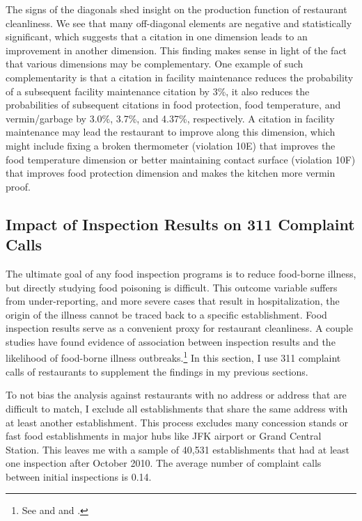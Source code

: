 \documentclass[11pt]{article}
\begin{document}
The signs of the diagonals shed insight on the production function of restaurant cleanliness. We see that many off-diagonal elements are negative and statistically significant, which suggests that a citation in one dimension leads to an improvement in another dimension. This finding makes sense in light of the fact that various dimensions may be complementary. One example of such complementarity is that a citation in facility maintenance reduces the probability of a subsequent facility maintenance citation by 3\%, it also reduces the probabilities of subsequent citations in food protection, food temperature, and vermin/garbage by 3.0\%, 3.7\%, and 4.37\%, respectively. A citation in facility maintenance may lead the restaurant to improve along this dimension, which might include fixing a broken thermometer (violation 10E) that improves the food temperature dimension or better maintaining contact surface (violation 10F) that improves food protection dimension and makes the kitchen more vermin proof. 

\subsection{Impact of Inspection Results on 311 Complaint Calls}
\label{complaints_analysis}
The ultimate goal of any food inspection programs is to reduce food-borne illness, but directly studying food poisoning is difficult. This outcome variable suffers from under-reporting, and more severe cases that result in hospitalization, the origin of the illness cannot be traced back to a specific establishment. Food inspection results serve as a convenient proxy for restaurant cleanliness. A couple studies have found evidence of association between inspection results and the likelihood of food-borne illness outbreaks.\footnote{See \cite{Irwin_89} and \cite{petran_12} and \cite{petran_12_a}.} In this section, I use 311 complaint calls of restaurants to supplement the findings in my previous sections.

To not bias the analysis against restaurants with no address or address that are difficult to match, I exclude all establishments that share the same address with at least another establishment. This process excludes many concession stands or fast food establishments in major hubs like JFK airport or Grand Central Station. This leaves me with a sample of 40,531 establishments that had at least one inspection after October 2010. The average number of complaint calls between initial inspections is 0.14. 
\end{document}
